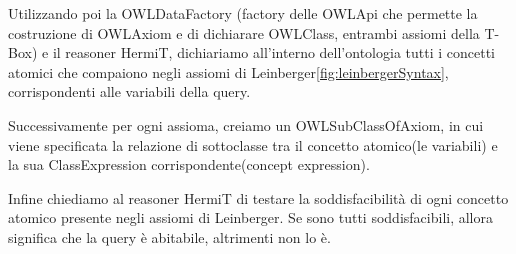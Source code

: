 Utilizzando poi la OWLDataFactory (factory delle OWLApi che permette la costruzione di OWLAxiom e di dichiarare OWLClass, entrambi assiomi della T-Box) e il reasoner HermiT\cite{HermiTWhitepaper}, dichiariamo all'interno dell'ontologia tutti i concetti atomici che compaiono negli assiomi di Leinberger\ref{fig:leinbergerSyntax}, corrispondenti alle variabili della query.

Successivamente per ogni assioma, creiamo un OWLSubClassOfAxiom, in cui viene specificata la relazione di sottoclasse tra il concetto atomico(le variabili) e la sua ClassExpression corrispondente(concept expression).

Infine chiediamo al reasoner HermiT di testare la soddisfacibilità di ogni concetto atomico presente negli assiomi di Leinberger. Se sono tutti soddisfacibili, allora significa che la query è abitabile, altrimenti non lo è.

\newpage
